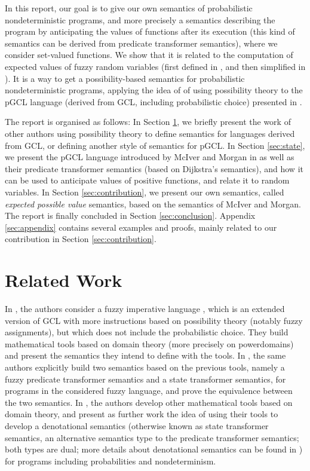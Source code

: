 \documentclass[a4paper,10pt]{llncs}
\begin{document}
In this report, our goal is to give our own semantics of probabilistic nondeterministic programs, and more precisely a semantics describing the program by anticipating the values of functions after its execution (this kind of semantics can be derived from predicate transformer semantics), where we consider set-valued functions. We show that it is related to the computation of expected values of fuzzy random variables (first defined in \cite{PuriRal86}, and then simplified in \cite{Shapiro09}). It is a way to get a possibility-based semantics for probabilistic nondeterministic programs, applying the idea of \cite{WuChen08,WuChen11,WuChen12} of using possibility theory to the pGCL language (derived from GCL, including probabilistic choice) presented in \cite{McIver05}.\bigskip

The report is organised as follows: In Section \ref{sec:related}, we briefly present the work of other authors using possibility theory to define semantics for languages derived from GCL, or defining another style of semantics for pGCL. In Section \ref{sec:state}, we present the pGCL language introduced by McIver and Morgan in \cite{McIver05} as well as their predicate transformer semantics (based on Dijkstra's semantics), and how it can be used to anticipate values of positive functions, and relate it to random variables. In Section \ref{sec:contribution}, we present our own semantics, called \emph{expected possible value} semantics, based on the semantics of McIver and Morgan. The report is finally concluded in Section \ref{sec:conclusion}. Appendix \ref{sec:appendix} contains several examples and proofs, mainly related to our contribution in Section \ref{sec:contribution}.

\section{Related Work}
\label{sec:related}

In \cite{WuChen08}, the authors consider a fuzzy imperative language \cite{Bueno93,Bueno97}, which is an extended version of GCL with more instructions based on possibility theory (notably fuzzy assignments), but which does not include the probabilistic choice. They build mathematical tools based on domain theory (more precisely on powerdomains) and present the semantics they intend to define with the tools.
In \cite{WuChen12}, the same authors explicitly build two semantics based on the previous tools, namely a fuzzy predicate transformer semantics and a state transformer semantics, for programs in the considered fuzzy language, and prove the equivalence between the two semantics. In \cite{Tix09}, the authors develop other mathematical tools based on domain theory, and present as further work the idea of using their tools to develop a denotational semantics (otherwise known as state transformer semantics, an alternative semantics type to the predicate transformer semantics; both types are dual; more details about denotational semantics can be found in \cite{Stoy77}) for programs including probabilities and nondeterminism. 
\end{document}
